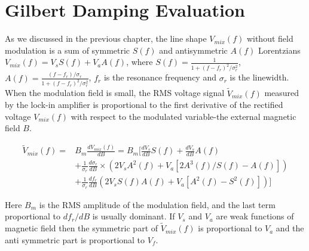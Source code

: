 \section{Gilbert Damping Evaluation}

As we discussed in the previous chapter, the line shape $V_{mix}(f)$  without field modulation is a sum of symmetric $S(f)$ and antisymmetric $A(f)$ Lorentzians $V_{mix}(f) = V_{s}S(f) + V_{a}A(f)$, where $S(f) = \frac{1}{1+(f-f_{r})^{2}/ \sigma_{r}^{2}}$, $A(f) = \frac{(f-f_{r})/\sigma_{r}}{1+(f-f_{r})^{2}/ \sigma_{r}^{2}}$, $f_{r}$ is the resonance frequency and $\sigma_{r}$ is the linewidth. When the modulation field is small, the RMS voltage signal  $\tilde{V}_{mix}(f)$ measured by the lock-in amplifier is proportional to the first derivative of the rectified voltage  $V_{mix}(f)$ with respect to the modulated variable-the external magnetic field $B$.


\begin{equation}
\begin{aligned}
  \tilde{V}_{mix}(f) = & B_{m}\frac{dV_{mix}(f)}{dB} = B_{m}[\frac{dV_{s}}{dB}S(f) + \frac{dV_{s}}{dB}A(f) \\ 
  & + \frac{1}{\sigma_{r}}\frac{d\sigma_r}{dB} 
  \times (2 V_{s} A^{2}(f) + V_{a}[2A^{3}(f)/S(f) - A(f)]) \\
 & + \frac{1}{\sigma_r}\frac{df_{r}}{dB}(2V_{s}S(f)A(f) + V_{a}[A^{2}(f) - S^{2}(f)])]  
\end{aligned}
\end{equation}

Here $B_{m}$ is the RMS amplitude of the modulation field, and the last term proportional to $df_{r}/dB$ is usually dominant. If $V_{s}$ and $V_{a}$ are weak functions of magnetic field then the symmetric part of $\tilde{V}_{mix}(f)$ is proportional to $V_{a}$ and the anti symmetric part is proportional to $V_{f}$.


